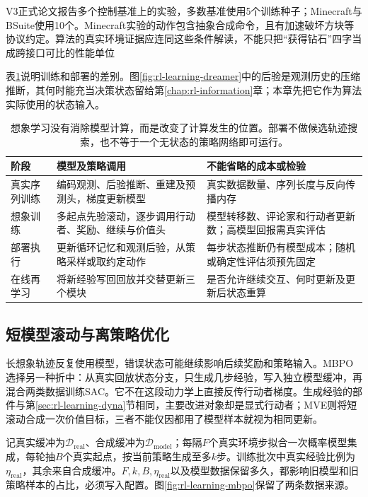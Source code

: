 V3正式论文报告多个控制基准上的实验，多数基准使用5个训练种子；Minecraft与BSuite使用10个。Minecraft实验的动作包含抽象合成命令，且有加速破坏方块等协议约定。算法的真实环境证据应连同这些条件解读，不能只把“获得钻石”四字当成跨接口可比的性能单位

表\ref{tab:rl-learning-imagination-cost}说明训练和部署的差别。图\ref{fig:rl-learning-dreamer}中的后验是观测历史的压缩推断，其何时能充当决策状态留给第\ref{chap:rl-information}章；本章先把它作为算法实际使用的状态输入。

\begin{table}[t]
  \centering
  \small
  \begin{tabularx}{\linewidth}{>{\raggedright\arraybackslash}p{24mm} >{\raggedright\arraybackslash}X >{\raggedright\arraybackslash}X}
    \toprule
    阶段 & 模型及策略调用 & 不能省略的成本或检验 \\
    \midrule
    真实序列训练 & 编码观测、后验推断、重建及预测头，梯度更新模型 & 真实数据数量、序列长度与反向传播内存 \\
    想象训练 & 多起点先验滚动，逐步调用行动者、奖励、继续与价值头 & 模型转移数、评论家和行动者更新数；高模型回报需真实评估 \\
    部署执行 & 更新循环记忆和观测后验，从策略采样或取约定动作 & 每步状态推断仍有模型成本；随机或确定性评估须预先固定 \\
    在线再学习 & 将新经验写回回放并交替更新三个模块 & 是否允许继续交互、何时更新及更新后状态重算 \\
    \bottomrule
  \end{tabularx}
  \caption{想象学习没有消除模型计算，而是改变了计算发生的位置。部署不做候选轨迹搜索，也不等于一个无状态的策略网络即可运行。}
  \label{tab:rl-learning-imagination-cost}
\end{table}

\subsection{短模型滚动与离策略优化}
\label{sec:rl-learning-mbpo}

长想象轨迹反复使用模型，错误状态可能继续影响后续奖励和策略输入。MBPO选择另一种折中：从真实回放状态分支，只生成几步经验，写入独立模型缓冲，再混合两类数据训练SAC。它不在这段动力学上直接反传行动者梯度。生成经验的部件与第\ref{sec:rl-learning-dyna}节相同，主要改进对象却是显式行动者；MVE则将短滚动合成一次价值目标，三者不能仅因都用了模型样本就视为相同更新。

记真实缓冲为$\mathcal D_{\mathrm{real}}$、合成缓冲为$\mathcal D_{\mathrm{model}}$；每隔$F$个真实环境步拟合一次概率模型集成，每轮抽$B$个真实起点，按当前策略生成至多$k$步。训练批次中真实经验比例为$\eta_{\mathrm{real}}$，其余来自合成缓冲。$F,k,B,\eta_{\mathrm{real}}$以及模型数据保留多久，都影响旧模型和旧策略样本的占比，必须写入配置。图\ref{fig:rl-learning-mbpo}保留了两条数据来源。

